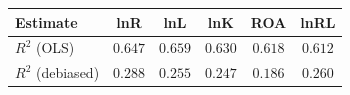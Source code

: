\begin{tabular}{l*{5}{c}}
\hline\hline
 Estimate & lnR & lnL & lnK & ROA & lnRL \\
\hline
\addlinespace $ R^2$ (OLS) & $0.647$ & $0.659$ & $0.630$ & $0.618$ & $0.612$ \\
$ R^2$ (debiased) & $0.288$ & $0.255$ & $0.247$ & $0.186$ & $0.260$ \\
\hline\hline
\end{tabular}
